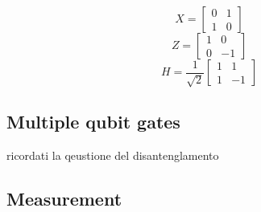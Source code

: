 \begin{equation}
    X = 
    \begin{bmatrix}
    0 & 1\\
    1 & 0
    \end{bmatrix}
\end{equation}
\begin{equation}
    Z = 
    \begin{bmatrix}
    1 & 0\\
    0 & -1
    \end{bmatrix}
\end{equation}
\begin{equation}
    H = \frac{1}{\sqrt{2}}
    \begin{bmatrix}
    1 & 1\\
    1 & -1
    \end{bmatrix}
\end{equation}
\subsection{Multiple qubit gates}
ricordati la qeustione del disantenglamento
\subsection{Measurement}\label{sec:measurement}